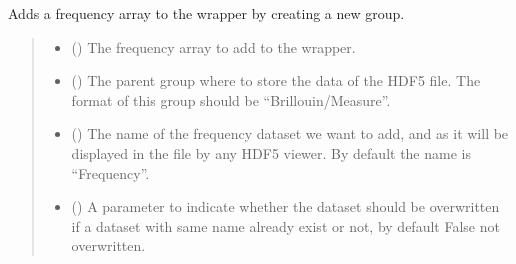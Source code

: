 \documentclass[letterpaper,10pt,english]{sphinxmanual}
\begin{document}
\begin{fulllineitems}
\begin{fulllineitems}
\label{\detokenize{_autosummary/HDF5_BLS.wrapper:HDF5_BLS.wrapper.Wrapper.add_frequency}}
\pysigstartsignatures
\pysiglinewithargsret
{}
{\sphinxparamcomma {}\sphinxparamcomma {}\sphinxparamcomma {}}
{}
\pysigstopsignatures
\sphinxAtStartPar
Adds a frequency array to the wrapper by creating a new group.
\begin{quote}\begin{description}
\begin{itemize}
\item {} 
\sphinxAtStartPar
{} () \textendash{} The frequency array to add to the wrapper.

\item {} 
\sphinxAtStartPar
{} (\sphinxstyleliteralemphasis{\sphinxupquote{, }}) \textendash{} The parent group where to store the data of the HDF5 file. The format of this group should be “Brillouin/Measure”.

\item {} 
\sphinxAtStartPar
{} (\sphinxstyleliteralemphasis{\sphinxupquote{, }}) \textendash{} The name of the frequency dataset we want to add, and as it will be displayed in the file by any HDF5 viewer. By default the name is “Frequency”.

\item {} 
\sphinxAtStartPar
{} (\sphinxstyleliteralemphasis{\sphinxupquote{, }}) \textendash{} A parameter to indicate whether the dataset should be overwritten if a dataset with same name already exist or not, by default False \sphinxhyphen{} not overwritten.

\end{itemize}


\end{description}
\end{quote}
\end{fulllineitems}
\end{fulllineitems}
\end{document}
